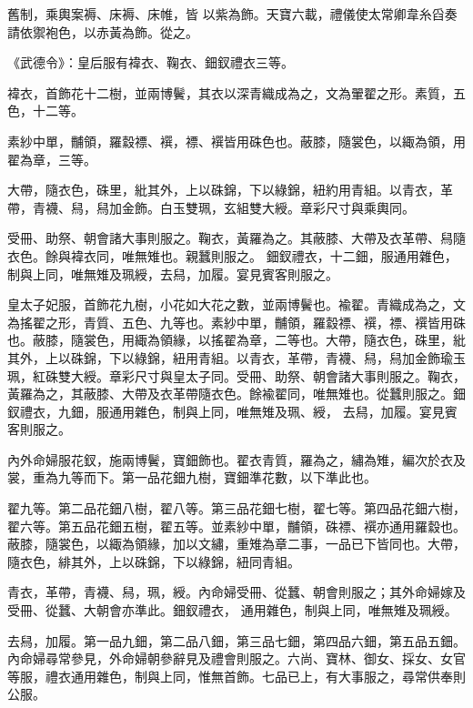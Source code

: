 \begin{pinyinscope}
 舊制，乘輿案褥、床褥、床帷，皆
 以紫為飾。天寶六載，禮儀使太常卿韋糸舀奏請依禦袍色，以赤黃為飾。從之。



 《武德令》：皇后服有褘衣、鞠衣、鈿釵禮衣三等。



 褘衣，首飾花十二樹，並兩博鬢，其衣以深青織成為之，文為翬翟之形。素質，五色，十二等。



 素紗中單，黼領，羅縠褾、襈，褾、襈皆用硃色也。蔽膝，隨裳色，以緅為領，用翟為章，三等。



 大帶，隨衣色，硃里，紕其外，上以硃錦，下以綠錦，紐約用青組。以青衣，革帶，青襪、舄，舄加金飾。白玉雙珮，玄組雙大綬。章彩尺寸與乘輿同。



 受冊、助祭、朝會諸大事則服之。鞠衣，黃羅為之。其蔽膝、大帶及衣革帶、舄隨衣色。餘與褘衣同，唯無雉也。親蠶則服之。
 鈿釵禮衣，十二鈿，服通用雜色，制與上同，唯無雉及珮綬，去舄，加履。宴見賓客則服之。



 皇太子妃服，首飾花九樹，小花如大花之數，並兩博鬢也。褕翟。青織成為之，文為搖翟之形，青質、五色、九等也。素紗中單，黼領，羅縠褾、襈，褾、襈皆用硃也。蔽膝，隨裳色，用緅為領緣，以搖翟為章，二等也。大帶，隨衣色，硃里，紕其外，上以硃錦，下以綠錦，紐用青組。以青衣，革帶，青襪、舄，舄加金飾瑜玉珮，紅硃雙大綬。章彩尺寸與皇太子同。受冊、助祭、朝會諸大事則服之。鞠衣，黃羅為之，其蔽膝、大帶及衣革帶隨衣色。餘褕翟同，唯無雉也。從蠶則服之。鈿釵禮衣，九鈿，服通用雜色，制與上同，唯無雉及珮、綬，
 去舄，加履。宴見賓客則服之。



 內外命婦服花釵，施兩博鬢，寶鈿飾也。翟衣青質，羅為之，繡為雉，編次於衣及裳，重為九等而下。第一品花鈿九樹，寶鈿準花數，以下準此也。



 翟九等。第二品花鈿八樹，翟八等。第三品花鈿七樹，翟七等。第四品花鈿六樹，翟六等。第五品花鈿五樹，翟五等。並素紗中單，黼領，硃褾、襈亦通用羅縠也。蔽膝，隨裳色，以緅為領緣，加以文繡，重雉為章二事，一品已下皆同也。大帶，隨衣色，緋其外，上以硃錦，下以綠錦，紐同青組。



 青衣，革帶，青襪、舄，珮，綬。內命婦受冊、從蠶、朝會則服之；其外命婦嫁及受冊、從蠶、大朝會亦準此。鈿釵禮衣，
 通用雜色，制與上同，唯無雉及珮綬。



 去舄，加履。第一品九鈿，第二品八鈿，第三品七鈿，第四品六鈿，第五品五鈿。內命婦尋常參見，外命婦朝參辭見及禮會則服之。六尚、寶林、御女、採女、女官等服，禮衣通用雜色，制與上同，惟無首飾。七品已上，有大事服之，尋常供奉則公服。




\end{pinyinscope}
